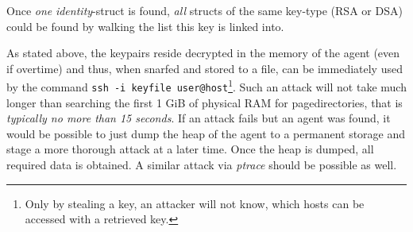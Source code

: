
Once \emph{one} \emph{identity}-struct is found, \emph{all} structs of the same
key-type (RSA or DSA) could be found by walking the list this key is linked
into.

As stated above, the keypairs reside decrypted in the memory of the agent (even
if overtime) and thus, when snarfed and stored to a file, can be immediately
used by the command \texttt{ssh~-i~keyfile~user@host}\footnote{Only by stealing
a key, an attacker will not know, which hosts can be accessed with a retrieved
key.}.  Such an attack will not take much longer than searching the first 1 GiB
of physical RAM for pagedirectories, that is \emph{typically no more than 15
seconds}. If an attack fails but an agent was found, it would be possible to
just dump the heap of the agent to a permanent storage and stage a more thorough
attack at a later time. Once the heap is dumped, all required data is obtained.
A similar attack via \emph{ptrace} should be possible as well.




